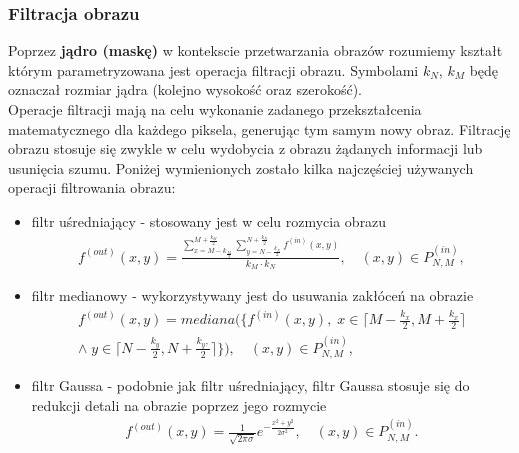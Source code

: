 \subsubsection{Filtracja obrazu}
Poprzez \textbf{jądro (maskę)} w kontekscie przetwarzania obrazów rozumiemy kształt którym parametryzowana jest operacja filtracji obrazu. Symbolami $k_N$, $k_M$ będę oznaczał rozmiar jądra (kolejno wysokość oraz szerokość).\\
Operacje filtracji mają na celu wykonanie zadanego przekształcenia matematycznego dla każdego piksela, generując tym samym nowy obraz. Filtrację obrazu stosuje się zwykle w celu wydobycia z obrazu żądanych informacji lub usunięcia szumu. Poniżej wymienionych zostało kilka najczęściej używanych operacji filtrowania obrazu:
\begin{itemize}
\item filtr uśredniający - stosowany jest w celu rozmycia obrazu
  \begin{gather*}
    f^{(out)}(x, y) = \frac{\sum\limits_{x=M-k_\frac{M}{2}}^{M+\frac{k_M}{2}} \sum\limits_{y=N-\frac{k_N}{2}}^{N+\frac{k_N}{2}} f^{(in)}(x, y)}{k_M \cdot k_N}, \quad (x, y) \in P^{(in)}_{N,M},
  \end{gather*}
\item filtr medianowy - wykorzystywany jest do usuwania zakłóceń na obrazie
  \begin{gather*}
    f^{(out)}(x, y) = mediana(\{f^{(in)}(x, y), \;x \in \lceil M-\frac{k_x}{2}, M+\frac{k_x}{2}\rceil \\
    \wedge\; y \in \lceil N-\frac{k_y}{2}, N+\frac{k_y,}{2}\rceil\}), \quad (x, y) \in P^{(in)}_{N,M},
    \end{gather*}
\item filtr Gaussa - podobnie jak filtr uśredniający, filtr Gaussa stosuje się do redukcji detali na obrazie poprzez jego rozmycie
  \begin{gather*}
    f^{(out)}(x, y) = \frac{1}{\sqrt{2 \pi \sigma}} e^{-\frac{x^2+y^2}{2 \sigma^2}}, \quad (x, y) \in P^{(in)}_{N,M}.
  \end{gather*}
\end{itemize}

